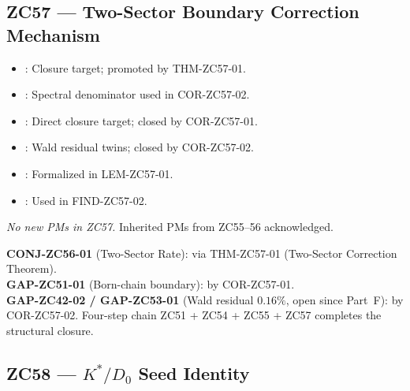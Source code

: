 \documentclass[12pt, a4paper]{article}
\begin{document}
\subsection{ZC57 --- Two-Sector Boundary Correction Mechanism}

\begin{inheritbox}[title={ZC57 Backward Inheritance}]
\begin{itemize}[leftmargin=1.5em]
\item {}: Closure target;
  promoted by THM-ZC57-01.
\item {}: Spectral
  denominator used in COR-ZC57-02.
\item {}: Direct
  closure target; closed by COR-ZC57-01.
\item {}: Wald residual twins; closed by COR-ZC57-02.
\item {}: Formalized in LEM-ZC57-01.
\item {}: Used in FIND-ZC57-02.
\end{itemize}
\end{inheritbox}

\begin{correctionbox}[title={ZC57 Forward Corrections / PMs}]
\textit{No new PMs in ZC57.} Inherited PMs from ZC55--56 acknowledged.
\end{correctionbox}

\begin{conmapbox}[title={ZC57 Closure / Promotion Record}]
\textbf{CONJ-ZC56-01} (Two-Sector Rate): \promotedstar{} via THM-ZC57-01
(Two-Sector Correction Theorem).\\[0.2em]
\textbf{GAP-ZC51-01} (Born-chain boundary): \closedcheck{} by
COR-ZC57-01.\\[0.2em]
\textbf{GAP-ZC42-02 / GAP-ZC53-01} (Wald residual $0.16\%$, open
since Part~F): \closedcheck{} by COR-ZC57-02. Four-step chain
ZC51 + ZC54 + ZC55 + ZC57 completes the structural closure.
\end{conmapbox}

\subsection{ZC58 --- $K^{*}/D_{0}$ Seed Identity}
\end{document}
